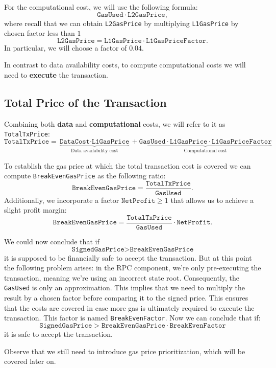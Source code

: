 For the computational cost, we will use the following formula:
\[
\texttt{GasUsed} \cdot \texttt{L2GasPrice},
\]
where recall that we can obtain \texttt{L2GasPrice} by multiplying \texttt{L1GasPrice} by chosen factor less than $1$
\[
\texttt{L2GasPrice} = \texttt{L1GasPrice} \cdot \texttt{L1GasPriceFactor}.
\]
In particular, we will choose a factor of $0.04$.

In contrast to data availability costs, to compute computational costs we will need to \textbf{execute} the transaction.

\subsection{Total Price of the Transaction}

Combining both \textbf{data} and \textbf{computational} costs, we will refer to it as \texttt{TotalTxPrice}:
\[
\texttt{TotalTxPrice} = \underbrace{\texttt{DataCost} \cdot \texttt{L1GasPrice}}_\text{Data availability cost} + \underbrace{\texttt{GasUsed} \cdot \texttt{L1GasPrice} \cdot \texttt{L1GasPriceFactor}}_\text{Computational cost}
\]

To establish the gas price at which the total transaction cost is covered we can compute \texttt{BreakEvenGasPrice} as the following ratio:
\[
\texttt{BreakEvenGasPrice} = \frac{\texttt{TotalTxPrice}}{\texttt{GasUsed}}.
\]
Additionally, we incorporate a factor $\texttt{NetProfit} \geq 1$ that allows us to achieve a slight profit margin:
\[
\texttt{BreakEvenGasPrice} = \frac{\texttt{TotalTxPrice}}{\texttt{GasUsed}} \cdot \texttt{NetProfit}.
\]

We could now conclude that if
\[
\texttt{SignedGasPrice} > \texttt{BreakEvenGasPrice}
\]
it is supposed to be financially safe to accept the transaction. But at this point the following problem arises: in the RPC component, we're only pre-executing the transaction, meaning we're using an incorrect state root. Consequently, the \texttt{GasUsed} is only an approximation. This implies that we need to multiply the result by a chosen factor before comparing it to the signed price. This ensures that the costs are covered in case more gas is ultimately required to execute the transaction. This factor is named \texttt{BreakEvenFactor}. Now we can conclude that if:
\[
\texttt{SignedGasPrice} > \texttt{BreakEvenGasPrice} \cdot \texttt{BreakEvenFactor}
\]
it is safe to accept the transaction.

Observe that we still need to introduce gas price prioritization, which will be covered later on.


